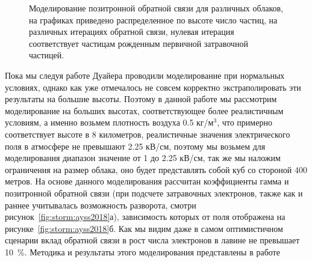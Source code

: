 \begin{figure}[ph!]
    \begin{center}
        \begin{minipage}[h]{0.49\linewidth}
        \end{minipage}
        \hfill
        \begin{minipage}[h]{0.49\linewidth}
        \end{minipage}
        \vfill
        \begin{minipage}[h]{0.49\linewidth}
        \end{minipage}
        \hfill
        \begin{minipage}[h]{0.49\linewidth}
        \end{minipage}
        \vfill
        \begin{minipage}[h]{0.49\linewidth}
        \end{minipage}
        \caption{Моделирование позитронной обратной связи для различных облаков, на графиках приведено распределенное по высоте число частиц, на различных итерациях обратной связи, нулевая итерация соответствует частицам рожденным первичной затравочной частицей.}
    \end{center}
    \label{fig:storm:vertical_gamma}
\end{figure}

Пока мы следуя работе Дуайера проводили моделирование при нормальных условиях, однако как уже отмечалось не совсем корректно экстраполировать эти результаты на большие высоты. Поэтому в данной работе мы рассмотрим моделирование на больших высотах, соответствующее более реалистичным условиям, а именно возьмем плотность воздуха 0.5 кг/м$^3$, что примерно соответствует высоте в 8 километров, реалистичные значения электрического поля в атмосфере не превышают 2.25 кВ/см, поэтому мы возьмем для моделирования диапазон значение от 1 до 2.25 кВ/см, так же мы наложим ограничения на размер облака, оно будет представлять собой куб со стороной 400 метров. На основе данного моделирования рассчитан коэффициенты гамма и позитронной обратной связи (при подсчете затравочных электронов, также как и раннее учитывалась возможность разворота, смотри рисунок~\ref{fig:storm:ayss2018}а), зависимость которых от поля отображена на рисунке~\ref{fig:storm:ayss2018}б. Как мы видим даже в самом оптимистичном сценарии вклад обратной связи в рост числа электронов в лавине не превышает 10~\%. Методика и результаты этого моделирования представлены в работе~\cite{antidwyer} 

